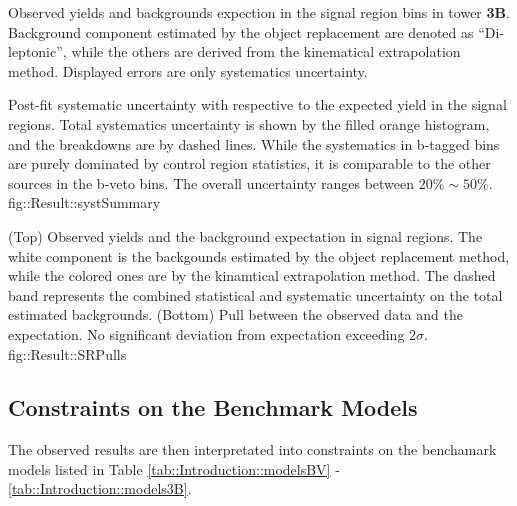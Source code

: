 \begin{table}
  \begin{center}
    \caption{
        Observed yields and backgrounds expection in the signal region bins in tower \textbf{3B}.
        Background component estimated by the object replacement are denoted as ``Di-leptonic'', 
        while the others are derived from the kinematical extrapolation method. Displayed errors are only systematics uncertainty.
    \label{tab::Result::yieldsSRs_3B}}
    
  \end{center}
\end{table}


{
    Post-fit systematic uncertainty with respective to the expected yield in the signal regions. 
    Total systematics uncertainty is shown by the filled orange histogram, and the breakdowns are by dashed lines.
    While the systematics in b-tagged bins are purely dominated by control region statistics, 
    it is comparable to the other sources in the b-veto bins. The overall uncertainty ranges between $20\%\sim50\%$.
}       
{fig::Result::systSummary}


\clearpage


    
{
    (Top) Observed yields and the background expectation in signal regions. The white component is the backgounds estimated by the object replacement method, while the colored ones are by the kinamtical extrapolation method. The dashed band represents the combined statistical and systematic uncertainty on the total estimated backgrounds.
    (Bottom) Pull between the observed data and the expectation. No significant deviation from expectation exceeding $2\sigma$.
}
{fig::Result::SRPulls}

                                                                                                                         
\clearpage
\subsection{Constraints on the Benchmark Models}
The observed results are then interpretated into constraints on the benchamark models listed in Table \ref{tab::Introduction::modelsBV} - \ref{tab::Introduction::models3B}.  \\


